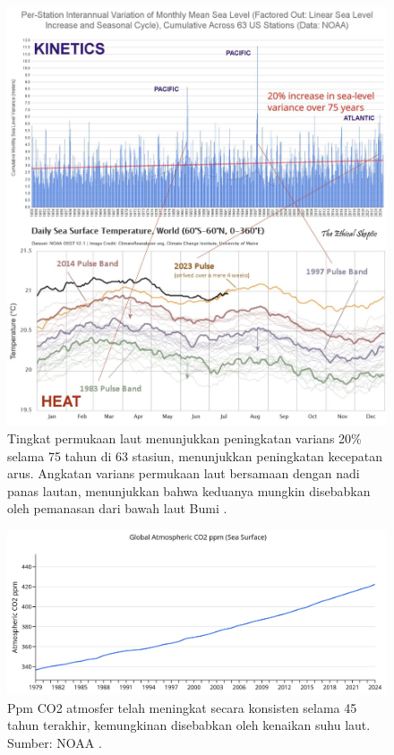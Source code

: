 \documentclass[10pt,twocolumn,letterpaper]{article}
\begin{document}
\begin{figure}[t]
\begin{center}
\includegraphics[width=1\textwidth]{sealevel.jpeg}
\end{center}
   \caption{Tingkat permukaan laut menunjukkan peningkatan varians 20\% selama 75 tahun di 63 stasiun, menunjukkan peningkatan kecepatan arus. Angkatan varians permukaan laut bersamaan dengan nadi panas lautan, menunjukkan bahwa keduanya mungkin disebabkan oleh pemanasan dari bawah laut Bumi \cite{2,129}.}
\label{fig:22}
\end{figure}

\begin{figure}[t]
\begin{center}
\includegraphics[width=1\textwidth]{co2.jpg}
\end{center}
   \caption{Ppm CO2 atmosfer telah meningkat secara konsisten selama 45 tahun terakhir, kemungkinan disebabkan oleh kenaikan suhu laut. Sumber: NOAA \cite{148,129}.}
\label{fig:23}
\end{figure}
\end{document}
